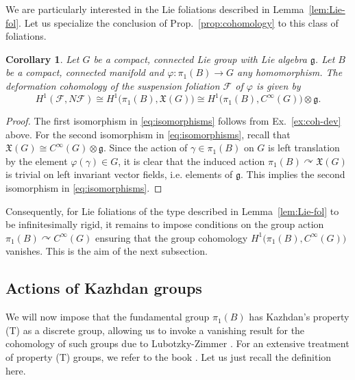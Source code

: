 \documentclass[11pt, letterpaper, oneside,reqno]{amsart}
\theoremstyle{plain}
\newtheorem{cor}[thm]{Corollary}
\theoremstyle{underline}
\theoremstyle{definition}
\theoremstyle{remark}
\begin{document}
	We are particularly interested in the Lie foliations described in Lemma~\ref{lem:Lie-fol}. Let us specialize the conclusion of Prop.~\ref{prop:cohomology} to this class of foliations.
	
	\begin{cor}\label{cor:group-coho}
		Let $G$ be a compact, connected Lie group with Lie algebra $\mathfrak{g}$. Let $B$ be a compact, connected manifold and $\varphi:\pi_1(B)\rightarrow G$ any homomorphism. The deformation cohomology of the suspension foliation $\mathcal{F}$ of $\varphi$ is given by 
		\begin{equation}\label{eq:isomorphisms}
			H^{1}(\mathcal{F},N\mathcal{F})\cong H^{1}\big(\pi_1(B),\mathfrak{X}(G)\big)\cong H^{1}\big(\pi_1(B),C^{\infty}(G)\big)\otimes\mathfrak{g}.
		\end{equation}
	\end{cor}
	\begin{proof}
		The first isomorphism in \eqref{eq:isomorphisms} follows from Ex.~\ref{ex:coh-dev} above. For the second isomorphism in \eqref{eq:isomorphisms}, recall that $\mathfrak{X}(G)\cong C^{\infty}(G)\otimes\mathfrak{g}$. Since the action of $\gamma\in\pi_{1}(B)$ on $G$ is left translation by the element $\varphi(\gamma)\in G$, it is clear that the induced action $\pi_1(B)\curvearrowright\mathfrak{X}(G)$ is trivial on left invariant vector fields, i.e. elements of $\mathfrak{g}$. This implies the second isomorphism in \eqref{eq:isomorphisms}.
	\end{proof}
	
	Consequently, for Lie foliations of the type described in Lemma~\ref{lem:Lie-fol} to be infinitesimally rigid, it remains to impose conditions on the group action $\pi_1(B)\curvearrowright C^{\infty}(G)$ ensuring that the group cohomology $H^{1}\big(\pi_1(B),C^{\infty}(G)\big)$ vanishes. This is the aim of the next subsection.
	
	
	
	\subsection{Actions of Kazhdan groups}
	We will now impose that the fundamental group $\pi_1(B)$ has Kazhdan's property (T) as a discrete group, allowing us to invoke a vanishing result for the cohomology of such groups due to Lubotzky-Zimmer \cite{Zimmer}.
	For an extensive treatment of property (T) groups, we refer to the book \cite{Kazhdan}. Let us just recall the definition here.
	
\end{document}
